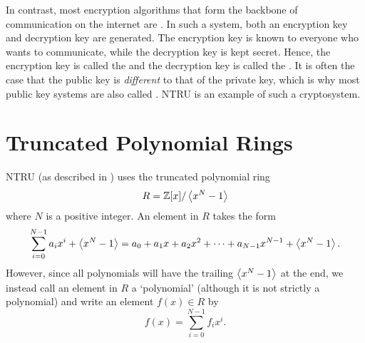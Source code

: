 In contrast, most encryption algorithms that form the backbone of communication on the internet are . In such a system, both an encryption key and decryption key are generated. The encryption key is known to everyone who wants to communicate, while the decryption key is kept secret. Hence, the encryption key is called the  and the decryption key is called the . It is often the case that the public key is \textit{different} to that of the private key, which is why most public key systems are also called . NTRU is an example of such a cryptosystem.

\section{Truncated Polynomial Rings}
NTRU (as described in \cite[\S 1.1]{hoffstein_pipher_silverman_1998}) uses the truncated polynomial ring
\[
    R = \mathbb{Z}[x] / \left\langle x^N - 1\right\rangle
\]
where $N$ is a positive integer. An element in $R$ takes the form
\[
    \sum_{i=0}^{N-1}a_ix^i + \left\langle x^N - 1\right\rangle = a_0 + a_1x + a_2x^2 + \cdots + a_{N-1}x^{N-1} + \left\langle x^N - 1\right\rangle.
\]
However, since all polynomials will have the trailing $\left\langle x^N - 1\right\rangle$ at the end, we instead call an element in $R$ a `polynomial' (although it is not strictly a polynomial) and write an element $f(x) \in R$ by
\[
    f(x) = \sum_{i=0}^{N-1}f_ix^i.
\]

